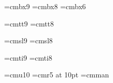 \font\ninebf=cmbx9
\font\eightbf=cmbx8
\font\sixbf=cmbx6

\font\ninett=cmtt9
\font\eighttt=cmtt8

\hyphenchar{} %
\hyphenchar{}
\hyphenchar{}

\font\ninesl=cmsl9
\font\eightsl=cmsl8

\font\nineit=cmti9
\font\eightit=cmti8

\font\tenu=cmu10 %
\font\magnifiedfiverm=cmr5 at 10pt
\font\cmman=cmman %

%
\newskip\ttglue
\def\tenpoint{\def\rm{\fam0\tenrm\tenmj}%
  \textfont0=\tenrm \scriptfont0=\sevenrm \scriptscriptfont0=\fiverm
  \textfont1=\teni \scriptfont1=\seveni \scriptscriptfont1=\fivei
  \textfont2=\tensy \scriptfont2=\sevensy \scriptscriptfont2=\fivesy
  \textfont3=\tenex \scriptfont3=\tenex \scriptscriptfont3=\tenex
  \setmathhangulfonts\texthangul\scripthangul\scriptscripthangul
  \def\it{\fam\itfam\tenit\tengtd}%
  \textfont\itfam=\tenit
  \def\sl{\fam\slfam\tensl\tengt}%
  \textfont\slfam=\tensl
  \def\bf{\fam\bffam\tenbf\tenbd}%
  \textfont\bffam=\tenbf \scriptfont\bffam=\sevenbf
  \scriptscriptfont\bffam=\fivebf
  \def\tt{\fam\ttfam\tentt\tentz}%
  \textfont\ttfam=\tentt
  \tt \ttglue=.5em plus.25em minus.15em
  \normalbaselineskip=14pt
  \let\sc=\eightrm
  \let\big=\tenbig
  \setbox\strutbox=\hbox{\vrule height8.5pt depth3.5pt width\z@}%
  \normalbaselines\rm}

\def\ninepoint{\def\rm{\fam0\ninerm\ninemj}%
  \textfont0=\ninerm \scriptfont0=\sixrm \scriptscriptfont0=\fiverm
  \textfont1=\ninei \scriptfont1=\sixi \scriptscriptfont1=\fivei
  \textfont2=\ninesy \scriptfont2=\sixsy \scriptscriptfont2=\fivesy
  \textfont3=\tenex \scriptfont3=\tenex \scriptscriptfont3=\tenex
  \setmathhangulfonts\texthangulnine\scripthangulsix\scriptscripthangul
  \def\it{\fam\itfam\nineit\ninegtd}%
  \textfont\itfam=\nineit
  \def\sl{\fam\slfam\ninesl\ninegt}%
  \textfont\slfam=\ninesl
  \def\bf{\fam\bffam\ninebf\ninebd}%
  \textfont\bffam=\ninebf \scriptfont\bffam=\sixbf
   \scriptscriptfont\bffam=\fivebf
  \def\tt{\fam\ttfam\ninett\ninetz}%
  \textfont\ttfam=\ninett
  \tt \ttglue=.5em plus.25em minus.15em
  \normalbaselineskip=13pt
  \let\sc=\sevenrm
  \let\big=\ninebig
  \setbox\strutbox=\hbox{\vrule height8pt depth3pt width\z@}%
  \normalbaselines\rm}

